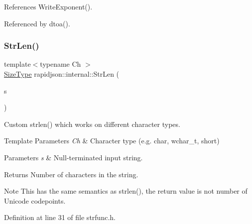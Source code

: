 References Write\+Exponent().



Referenced by dtoa().

\mbox{\label{namespacerapidjson_1_1internal_abe45d9242ecab3b9b58117961f57dc2f}} 
\subsubsection{\texorpdfstring{StrLen()}{StrLen()}\hspace{0.1cm}{\footnotesize\ttfamily [1/3]}}
{\footnotesize\ttfamily template$<$typename Ch $>$ \\
\mbox{\hyperlink{namespacerapidjson_a44eb33eaa523e36d466b1ced64b85c84}{Size\+Type}} rapidjson\+::internal\+::\+Str\+Len (\begin{DoxyParamCaption}\item[{const Ch $\ast$}]{s }\end{DoxyParamCaption})}



Custom strlen() which works on different character types. 


\begin{DoxyTemplParams}{Template Parameters}
{\em Ch} & Character type (e.\+g. char, wchar\+\_\+t, short) \\
\hline
\end{DoxyTemplParams}

\begin{DoxyParams}{Parameters}
{\em s} & Null-\/terminated input string. \\
\hline
\end{DoxyParams}
\begin{DoxyReturn}{Returns}
Number of characters in the string. 
\end{DoxyReturn}
\begin{DoxyNote}{Note}
This has the same semantics as strlen(), the return value is not number of Unicode codepoints. 
\end{DoxyNote}


Definition at line 31 of file strfunc.\+h.


\begin{DoxyCode}{0}

\end{DoxyCode}


